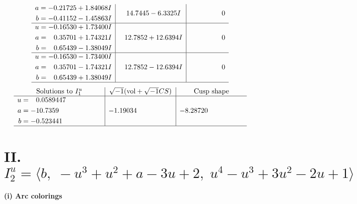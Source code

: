 \documentclass[1p]{elsarticle_modified}
\theoremstyle{definition}
\newcommand{\I}{\sqrt{-1}}
\begin{document}
$$\begin{array}{c|c|c}
\begin{aligned}
a &= -0.21725 + 1.84068 I \\
b &= -0.41152 - 1.45863 I\end{aligned}
 & \phantom{-}14.7445 - 6.3325 I & \phantom{-0.000000 } 0 \\ \hline\begin{aligned}
u &= -0.16530 + 1.73400 I \\
a &= \phantom{-}0.35701 + 1.74321 I \\
b &= \phantom{-}0.65439 - 1.38049 I\end{aligned}
 & \phantom{-}12.7852 + 12.6394 I & \phantom{-0.000000 } 0 \\ \hline\begin{aligned}
u &= -0.16530 - 1.73400 I \\
a &= \phantom{-}0.35701 - 1.74321 I \\
b &= \phantom{-}0.65439 + 1.38049 I\end{aligned}
 & \phantom{-}12.7852 - 12.6394 I & \phantom{-0.000000 } 0\\
 \hline 
 \end{array}$$\newpage$$\begin{array}{c|c|c}  
\text{Solutions to }I^u_{1}& \I (\text{vol} + \sqrt{-1}CS) & \text{Cusp shape}\\
 \hline 
\begin{aligned}
u &= \phantom{-}0.0589447\phantom{ +0.000000I} \\
a &= -10.7359\phantom{ +0.000000I} \\
b &= -0.523441\phantom{ +0.000000I}\end{aligned}
 & -1.19034\phantom{ +0.000000I} & -8.28720\phantom{ +0.000000I}\\
 \hline 
 \end{array}$$\newpage\newpage\renewcommand{\arraystretch}{1}
\centering \section*{II. $I^u_{2}= \langle b,\;- u^3+u^2+a-3 u+2,\;u^4- u^3+3 u^2-2 u+1 \rangle$}
\flushleft \textbf{(i) Arc colorings}\\
\end{document}
